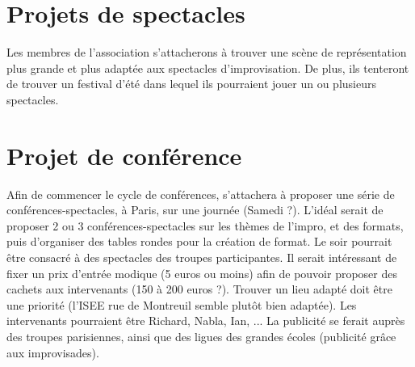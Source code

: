 \documentclass[a4paper,french,10pt]{article}
\begin{document}
\section{Projets de spectacles}
Les membres de l'association s'attacherons à trouver une scène de représentation plus grande et plus adaptée aux spectacles d'improvisation. De plus, ils tenteront de trouver un festival d'été dans lequel ils pourraient jouer un ou plusieurs spectacles.

\section{Projet de conférence}
Afin de commencer le cycle de conférences, \meta{} s'attachera à proposer une série de conférences-spectacles, à Paris, sur une journée (Samedi ?). L'idéal serait de proposer 2 ou 3 conférences-spectacles sur les thèmes de l'impro, et des formats, puis d'organiser des tables rondes pour la création de format. Le soir pourrait être consacré à des spectacles des troupes participantes. Il serait intéressant de fixer un prix d'entrée modique (5 euros ou moins) afin de pouvoir proposer des cachets aux intervenants (150 à 200 euros ?).
Trouver un lieu adapté doit être une priorité (l'ISEE rue de Montreuil semble plutôt bien adaptée). Les intervenants pourraient être Richard, Nabla, Ian, ...
La publicité se ferait auprès des troupes parisiennes, ainsi que des ligues des grandes écoles (publicité grâce aux improvisades).
\end{document}
